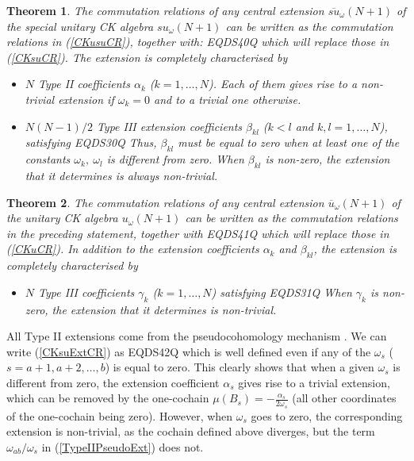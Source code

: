 \documentclass[12pt]{article}
\newtheorem{theorem}{Theorem}[section]
\begin{document}
\begin{theorem}
\label{theor4.1}
The  commutation relations of any central extension
$\overline{su}_{\omega}(N+1)$ of the special unitary CK algebra
${su}_{\omega}(N+1)$ can be written as the commutation relations in
(\ref{CKusuCR}), together with:
EQDS40Q
which will replace those in (\ref{CKsuCR}). The extension is
completely characterised by

\begin{itemize}
\item $N$ Type II coefficients ${{\alpha}_{k}}$ ($k=1,\dots,N$).
Each of them gives rise to a non-trivial extension if
${\omega}_k= 0$ and to a trivial one otherwise.

\item $N(N-1)/2$ Type III extension coefficients ${\beta}_{kl}$
($k<l$ and
$k,l=1,\dots,N$), satisfying
EQDS30Q
Thus, ${\beta}_{kl}$ must be equal to zero when at least one of the
constants ${\omega}_k,\ {\omega}_l$ is different from zero. When ${\beta}_{kl}$ is
non-zero, the extension that it determines is always non-trivial.
\end{itemize}
\end{theorem}

\begin{theorem}
\label{theor4.2}
The  commutation relations of any central extension
$\overline{u}_{\omega}(N+1)$ of the unitary CK algebra
${u}_{\omega}(N+1)$ can be written as the commutation relations in
the preceding statement, together with
EQDS41Q
which will replace those in (\ref{CKuCR}). In addition to the
extension coefficients ${{\alpha}_{k}}$ and ${\beta}_{kl}$, the
extension is completely characterised by
\begin{itemize}
\item
$N$ Type III coefficients ${{\gamma}_{k}}$ ($k=1,\dots,N$) satisfying
EQDS31Q
When ${\gamma}_k$ is non-zero, the extension that it determines is non-trivial.
\end{itemize}
\end{theorem}

All Type II extensions come from the pseudocohomology mechanism
\cite{Ald.Azc:85b,Azc.Izq:95}. We can write (\ref{CKsuExtCR}) as
EQDS42Q
which is well defined even if any of the ${\omega}_s$
($s=a+1, a+2, \dots, b$) is equal to zero.
This clearly shows that when a given
${\omega}_s$  is different from zero, the extension
coefficient
${\alpha}_{s}$ gives rise to a trivial extension, which can be
removed by the one-cochain
$\mu(B_s)=-\frac{{\alpha}_s}{2 {\omega}_s}$ (all other coordinates of the
one-cochain being zero). However, when ${\omega}_s$ goes to zero, the
corresponding extension is non-trivial, as the cochain  defined above
diverges, but the term ${\omega}_{ab}/{\omega}_s$
in (\ref{TypeIIPseudoExt}) does not.
\end{document}

